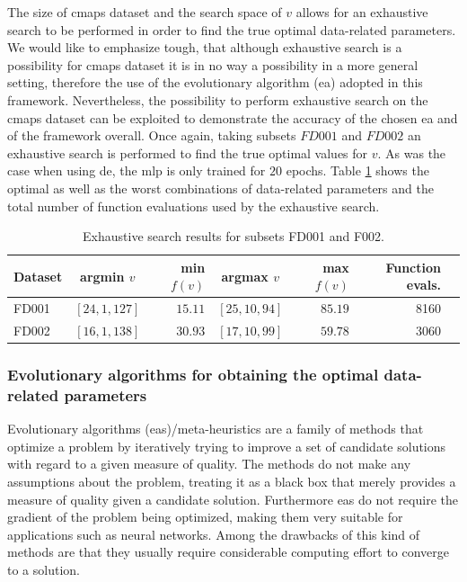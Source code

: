 \documentclass{article}
\begin{document}
The size of \gls{cmaps} dataset and the search space of $v$ allows for an exhaustive search to be performed in order to find the true optimal data-related parameters. We would like to emphasize tough, that although exhaustive search is a possibility for \gls{cmaps} dataset it is in no way a possibility in a more general setting, therefore the use of the evolutionary algorithm (\gls{ea}) adopted in this framework. Nevertheless, the possibility to perform exhaustive search on the \gls{cmaps} dataset can be exploited to demonstrate the accuracy of the chosen \gls{ea} and of the framework overall. Once again, taking subsets $FD001$ and $FD002$ an exhaustive search is performed to find the true optimal values for $v$. As was the case when using \gls{de}, the \gls{mlp} is only trained for $20$ epochs. Table \ref{table:true_optimal_data_params} shows the optimal as well as the worst combinations of data-related parameters and the total number of function evaluations used by the exhaustive search.

\begin{table}[!htb]
\centering
\begin{tabular}{l | c r c r r l}
	\hline
	 Dataset & argmin $v$ & min $f(v)$ & argmax $v$ & max $f(v)$ & Function evals.\\
  	\hline
  	FD001 & $\left[ 24, 1, 127 \right]$ & $15.11$ & $\left[ 25, 10, 94 \right]$ & $85.19$ & 8160\\
  	FD002 & $\left[ 16, 1, 138 \right]$ & $30.93$ & $\left[ 17, 10, 99 \right]$ & $59.78$ & 3060\\
  	\hline
\end{tabular}
\caption{Exhaustive search results for subsets FD001 and F002.}
\label{table:true_optimal_data_params}
\end{table}

\subsubsection{Evolutionary algorithms for obtaining the optimal data-related parameters}
\label{sec:ea_optimization_process}

Evolutionary algorithms (\glspl{ea})/meta-heuristics are a family of methods that optimize a problem by iteratively trying to improve a set of candidate solutions with regard to a given measure of quality. The methods do not make any assumptions about the problem, treating it as a black box that merely provides a measure of quality given a candidate solution. Furthermore \glspl{ea} do not require the gradient of the problem being optimized, making them very suitable for applications such as neural networks. Among the drawbacks of this kind of methods are that they usually require considerable computing effort to converge to a solution.
\end{document}
